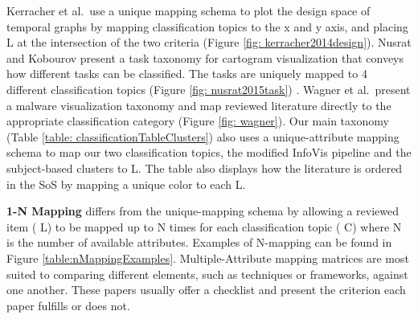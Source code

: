 Kerracher et al.\ use a unique mapping schema to plot the design space of temporal graphs \cite{kerracher2014design} by mapping classification topics to the x and y axis, and placing {\color{blue} L} at the intersection of the two criteria (Figure \ref{fig: kerracher2014design}). Nusrat and Kobourov present a task taxonomy for cartogram visualization that conveys how different tasks can be classified. The tasks are uniquely mapped to 4 different classification topics (Figure \ref{fig: nusrat2015task}) \cite{nusrat2015task}. Wagner et al.\ present a malware visualization taxonomy and map reviewed literature directly to the appropriate classification category (Figure \ref{fig: wagner})\cite{wagner2015survey}. 
Our main taxonomy (Table \ref{table: classificationTableClusters}) also uses a unique-attribute mapping schema to map our two classification topics, the modified InfoVis pipeline and the subject-based clusters to {\color{blue} L}. The table also displays how the literature is ordered in the SoS by mapping a unique color to each {\color{blue} L}.

\textbf{1-N Mapping} differs from the unique-mapping schema by allowing a reviewed item ({\color{blue} L}) to be mapped up to N times for each classification topic ({\color{red} C}) where N is the number of available attributes. Examples of N-mapping can be found in Figure \ref{table:nMappingExamples}. Multiple-Attribute mapping matrices are most suited to comparing different elements, such as techniques or frameworks, against one another. These papers usually offer a checklist and present the criterion each paper fulfills or does not.

